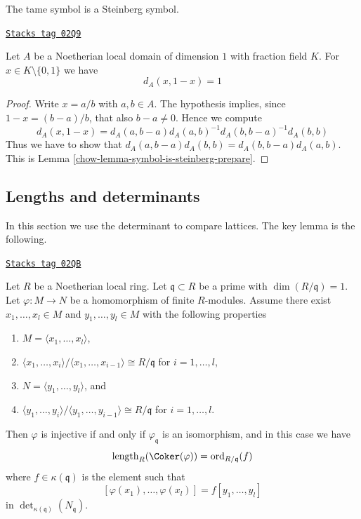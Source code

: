 The tame symbol is a Steinberg symbol.

\begin{lemma}
\label{chow-lemma-symbol-is-steinberg}
\href{https://stacks.math.columbia.edu/tag/02Q9}{\texttt{Stacks tag 02Q9}}

Let $A$ be a Noetherian local domain of dimension $1$
with fraction field $K$. For $x \in K \setminus \{0, 1\}$
we have
$$
d_A(x, 1 -x) = 1
$$
\end{lemma}

\begin{proof}

Write $x = a/b$ with $a, b \in A$.
The hypothesis implies, since $1 - x = (b - a)/b$,
that also $b - a \not = 0$. Hence we compute
$$
d_A(x, 1 - x)
=
d_A(a, b - a)d_A(a, b)^{-1}d_A(b, b - a)^{-1}d_A(b, b)
$$
Thus we have to show that
$d_A(a, b - a) d_A(b, b) = d_A(b, b - a) d_A(a, b)$.
This is Lemma \ref{chow-lemma-symbol-is-steinberg-prepare}.
\end{proof}


\subsection{Lengths and determinants}
\label{chow-subsection-length-determinant}

In this section we use the determinant to compare lattices.
The key lemma is the following.

\begin{lemma}
\label{chow-lemma-key-lemma}
\href{https://stacks.math.columbia.edu/tag/02QB}{\texttt{Stacks tag 02QB}}

Let $R$ be a Noetherian local ring.
Let $\mathfrak q \subset R$ be a prime with $\dim(R/\mathfrak q) = 1$.
Let $\varphi : M \to N$ be a homomorphism of finite $R$-modules.
Assume there exist $x_1, \ldots, x_l \in M$ and $y_1, \ldots, y_l \in M$
with the following properties
\begin{enumerate}
\item $M = \langle x_1, \ldots, x_l\rangle$,
\item $\langle x_1, \ldots, x_i\rangle / \langle x_1, \ldots, x_{i - 1}\rangle
\cong R/\mathfrak q$ for $i = 1, \ldots, l$,
\item $N = \langle y_1, \ldots, y_l\rangle$, and
\item $\langle y_1, \ldots, y_i\rangle / \langle y_1, \ldots, y_{i - 1}\rangle
\cong R/\mathfrak q$ for $i = 1, \ldots, l$.
\end{enumerate}
Then $\varphi$ is injective if and only if $\varphi_{\mathfrak q}$ is an
isomorphism, and in this case we have
$$
\text{length}_R(\Coker(\varphi)) = \text{ord}_{R/\mathfrak q}(f)
$$
where $f \in \kappa(\mathfrak q)$ is the element such that
$$
[\varphi(x_1), \ldots, \varphi(x_l)] = f [y_1, \ldots, y_l]
$$
in $\det_{\kappa(\mathfrak q)}(N_{\mathfrak q})$.
\end{lemma}

